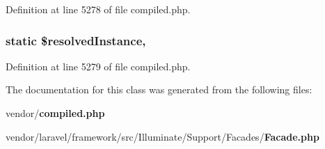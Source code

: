 Definition at line 5278 of file compiled.\+php.

\subsubsection[{\$resolved\+Instance}]{\setlength{\rightskip}{0pt plus 5cm}static \$resolved\+Instance\hspace{0.3cm}{\ttfamily [static]}, {\ttfamily [protected]}}\label{class_illuminate_1_1_support_1_1_facades_1_1_facade_ae2f1724757dfc8386212e3b7bc660895}


Definition at line 5279 of file compiled.\+php.



The documentation for this class was generated from the following files\+:\begin{DoxyCompactItemize}
\item 
vendor/{\bf compiled.\+php}\item 
vendor/laravel/framework/src/\+Illuminate/\+Support/\+Facades/{\bf Facade.\+php}\end{DoxyCompactItemize}

